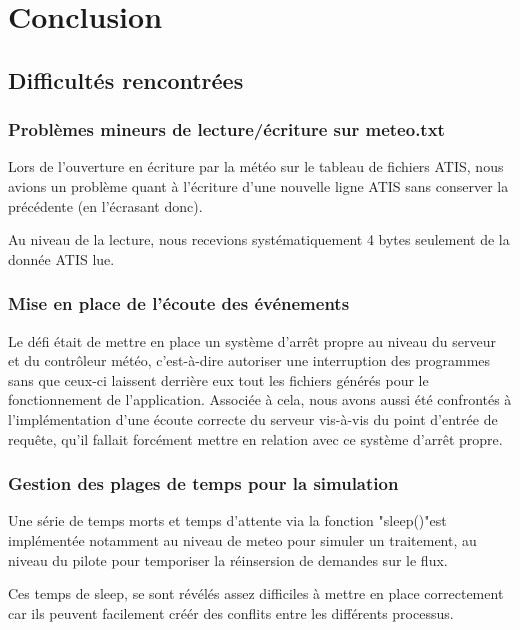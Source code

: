 \documentclass{report}
\begin{document}
{\chapter{Conclusion}
	
	\section{Difficultés rencontrées}

		\subsection{Problèmes mineurs de lecture/écriture sur meteo.txt}

			Lors de l'ouverture en écriture par la météo sur le tableau de fichiers ATIS, nous avions un problème quant à l'écriture d'une nouvelle ligne ATIS sans conserver la précédente (en l'écrasant donc).

			Au niveau de la lecture, nous recevions systématiquement 4 bytes seulement de la donnée ATIS lue.

		\subsection{Mise en place de l'écoute des événements}

			Le défi était de mettre en place un système d'arrêt propre au niveau du serveur et du contrôleur météo, c'est-à-dire autoriser une interruption des programmes sans que ceux-ci laissent derrière eux tout les fichiers générés pour le fonctionnement de l'application.
			Associée à cela, nous avons aussi été confrontés à l'implémentation d'une écoute correcte du serveur vis-à-vis du point d'entrée de requête, qu'il fallait forcément mettre en relation avec ce système d'arrêt propre.


		\subsection{Gestion des plages de temps pour la simulation}

			Une série de temps morts et temps d'attente via la fonction "sleep()"est implémentée notamment au niveau de meteo pour simuler un traitement, au niveau du pilote pour temporiser la réinsersion de demandes sur le flux.

			Ces temps de sleep, se sont révélés assez difficiles à mettre en place correctement car ils peuvent facilement créér des conflits entre les différents processus.

}
\end{document}

